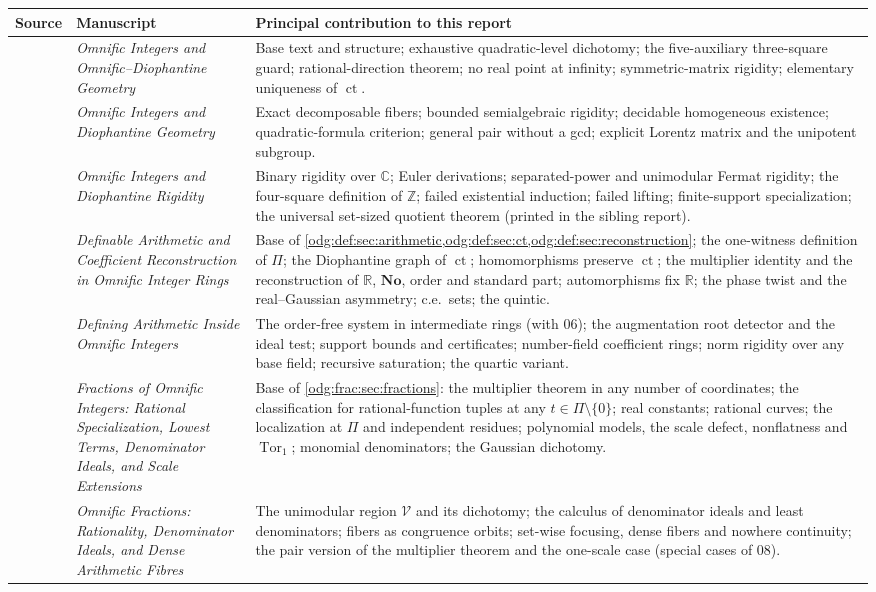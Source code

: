 \documentclass[11pt,oneside]{article}
\numberwithin{equation}{section}
\theoremstyle{definition}
\theoremstyle{remark}
\newcommand{\No}{\mathbf{No}}
\newcommand{\Z}{\mathbb Z}
\newcommand{\R}{\mathbb R}
\newcommand{\C}{\mathbb C}
\newcommand{\ct}{\operatorname{ct}}
\newcommand{\Tor}{\operatorname{Tor}}
\newcommand{\Vreg}{\mathcal V}
\begin{document}
\begin{center}
\renewcommand{\arraystretch}{1.2}
\begin{tabular}{>{\raggedright\arraybackslash}p{}>{\raggedright\arraybackslash}p{}>{\raggedright\arraybackslash}p{}}
\toprule
Source & Manuscript & Principal contribution to this report\\
\midrule
01 & \emph{Omnific Integers and Omnific--Diophantine Geometry} &
Base text and structure; exhaustive quadratic-level dichotomy; the
five-auxiliary three-square guard; rational-direction theorem; no real point
at infinity; symmetric-matrix rigidity; elementary uniqueness of $\ct$.\\
02 & \emph{Omnific Integers and Diophantine Geometry} &
Exact decomposable fibers; bounded semialgebraic rigidity; decidable
homogeneous existence; quadratic-formula criterion; general pair without a
gcd; explicit Lorentz matrix and the unipotent subgroup.\\
05 & \emph{Omnific Integers and Diophantine Rigidity} &
Binary rigidity over $\C$; Euler derivations; separated-power and
unimodular Fermat rigidity; the four-square definition of $\Z$; failed
existential induction; failed lifting; finite-support specialization; the
universal set-sized quotient theorem (printed in the sibling report).\\
06 & \emph{Definable Arithmetic and Coefficient Reconstruction in Omnific
Integer Rings} &
Base of \cref{odg:def:sec:arithmetic,odg:def:sec:ct,odg:def:sec:reconstruction};
the one-witness definition of $\Pi$; the Diophantine graph of $\ct$;
homomorphisms preserve $\ct$; the multiplier identity and the reconstruction
of $\R$, $\No$, order and standard part; automorphisms fix $\R$; the phase
twist and the real--Gaussian asymmetry; c.e.\ sets; the quintic.\\
07 & \emph{Defining Arithmetic Inside Omnific Integers} &
The order-free system in intermediate rings (with 06); the augmentation root
detector and the ideal test; support bounds and certificates; number-field
coefficient rings; norm rigidity over any base field; recursive saturation;
the quartic variant.\\
08 & \emph{Fractions of Omnific Integers: Rational Specialization, Lowest
Terms, Denominator Ideals, and Scale Extensions} &
Base of \cref{odg:frac:sec:fractions}: the multiplier theorem in any number of
coordinates; the classification for rational-function tuples at any
$t\in\Pi\setminus\{0\}$; real constants; rational curves; the localization at
$\Pi$ and independent residues; polynomial models, the scale defect, nonflatness
and $\Tor_1$; monomial denominators; the Gaussian dichotomy.\\
09 & \emph{Omnific Fractions: Rationality, Denominator Ideals, and Dense
Arithmetic Fibres} &
The unimodular region $\Vreg$ and its dichotomy; the calculus of denominator
ideals and least denominators; fibers as congruence orbits; set-wise focusing,
dense fibers and nowhere continuity; the pair version of the multiplier
theorem and the one-scale case (special cases of 08).\\
\bottomrule
\end{tabular}
\end{center}
\end{document}
